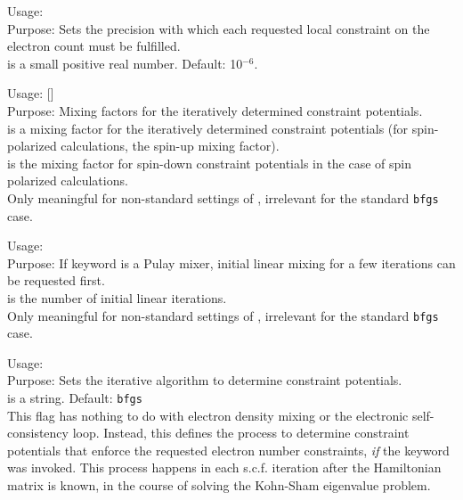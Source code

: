 {
  \noindent
  Usage:   \\[1.0ex]
  Purpose: Sets the precision with which each requested local
    constraint on the electron count must be fulfilled. \\[1.0ex]
   is a small positive real number. Default:
  10$^{-6}$. \\
}

{
  \noindent
  Usage:   []
    \\[1.0ex]
  Purpose: Mixing factors for the iteratively determined constraint
    potentials. \\[1.0ex] 
   is a mixing factor for the iteratively determined
    constraint potentials (for spin-polarized calculations, the
    spin-up mixing factor). \\
   is the mixing factor for spin-down constraint
    potentials in the case of spin polarized calculations. \\
}
Only meaningful for non-standard settings of
, irrelevant for the standard
\texttt{bfgs} case. 

{
  \noindent
  Usage:  
    \\[1.0ex]
  Purpose: If keyword  is a Pulay mixer,
    initial linear mixing for a few iterations can be requested
    first. \\[1.0ex]
   is the number of initial linear iterations. \\
}
Only meaningful for non-standard settings of
, irrelevant for the standard
\texttt{bfgs} case. 

{
  \noindent
  Usage:   \\[1.0ex]
  Purpose: Sets the iterative algorithm to determine constraint
    potentials. \\[1.0ex]
   is a string. Default: \texttt{bfgs} \\
}
This flag has nothing to do with electron density mixing or the
electronic self-consistency loop. Instead, this defines the process to
determine constraint potentials that enforce the requested electron
number constraints, \emph{if} the keyword  was
invoked. This process happens in each  
s.c.f. iteration after the Hamiltonian matrix is known, in the
course of solving the Kohn-Sham eigenvalue problem.

